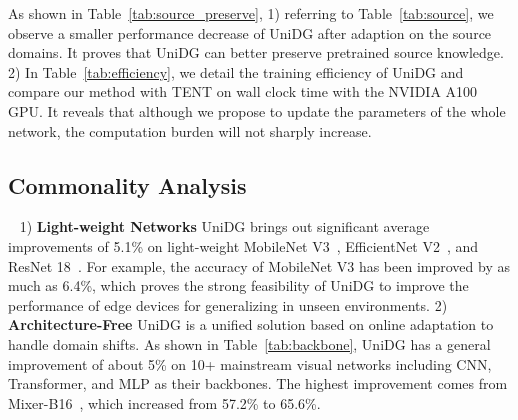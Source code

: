 \documentclass{article} \usepackage{iclr2024_conference,times}
\def\Model{UniDG }
\begin{document}
\begin{table}[ht]
    \vspace{-3mm}
    \caption{Source knowledge preserve and training efficiency of UniDG.}
    \label{tab:source_preserve}
    \centering
    \vspace{-3mm}	
\vspace{-3mm}	
\end{table}
 As shown in Table~\ref{tab:source_preserve}, 1) referring to Table~\ref{tab:source}, we observe a smaller performance decrease of UniDG after adaption on the source domains. It proves that UniDG can better preserve pretrained source knowledge. 2) In Table~\ref{tab:efficiency}, we detail the training efficiency of UniDG and compare our method with TENT on wall clock time with the NVIDIA A100 GPU. It reveals that although we propose to update the parameters of the whole network, the computation burden will not sharply increase.
\subsection{Commonality Analysis} ~\label{sec:exp:backbone}
1) \textbf{Light-weight Networks}
\Model brings out significant average improvements of 5.1\% on light-weight MobileNet V3~\citep{howard2019searching}, EfficientNet V2~\citep{tan2021efficientnetv2}, and ResNet 18~\citep{he2016deep}. For example, the accuracy of MobileNet V3 has been improved by as much as 6.4\%, which proves the strong feasibility of \Model to improve the performance of edge devices for generalizing in unseen environments.
2) \textbf{Architecture-Free}
\Model is a unified solution based on online adaptation to handle domain shifts. As shown in Table~\ref{tab:backbone}, \Model has a general improvement of about 5\% on 10+ mainstream visual networks including CNN, Transformer, and MLP as their backbones. The highest improvement comes from Mixer-B16~\citep{tolstikhin2021mlp}, which increased from 57.2\% to 65.6\%.
\vspace{-3mm}
\end{document}

